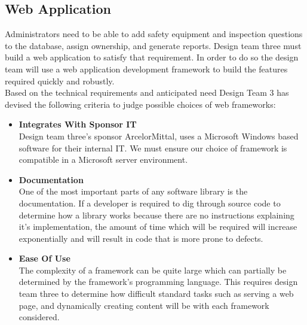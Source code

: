 \documentclass[Letter,11pt]{article}
\begin{document}
	\subsection{Web Application}
		Administrators need to be able to add safety equipment and inspection questions to the database, assign ownership, and generate reports. Design team three must build a web application to satisfy that requirement. In order to do so the design team will use a web application development framework to build the features required quickly and robustly.
		\\
		Based on the technical requirements and anticipated need Design Team 3 has devised the following criteria to judge possible choices of web frameworks:
		\\
		\begin{minipage}[t]{0.5\textwidth}
		\begin{itemize}
			\item \textbf{Integrates With Sponsor IT}\\
			Design team three's sponsor ArcelorMittal, uses a Microsoft Windows based software for their internal IT. We must ensure our choice of framework is compatible in a Microsoft server environment.

			\item \textbf{Documentation}\\
			One of the most important parts of any software library is the documentation. If a developer is required to dig through source code to determine how a library works because there are no instructions explaining it's implementation, the amount of time which will be required will increase exponentially and will result in code that is more prone to defects.

			\item \textbf{Ease Of Use} \\
			The complexity of a framework can be quite large which can partially be determined by the framework's programming language. This requires design team three to determine how difficult standard tasks such as serving a web page, and dynamically creating content will be with each framework considered.
		\end{itemize}
		\end{minipage}
\end{document}
